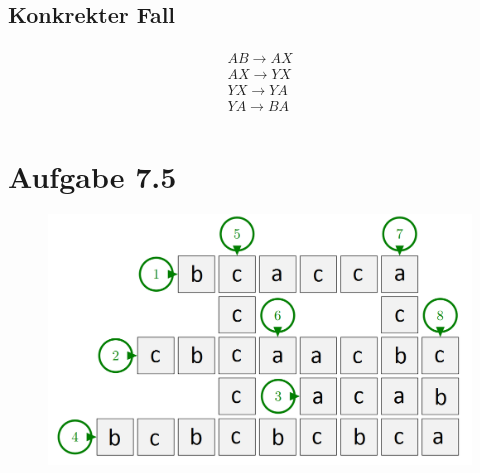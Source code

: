 \documentclass{article}
\begin{document}
\subsection*{Konkrekter Fall}
\begin{align*}
\begin{array}{l}
AB \rightarrow AX \\
AX \rightarrow YX \\
YX \rightarrow YA \\
YA \rightarrow BA
\end{array}
\end{align*}


\clearpage
\section*{Aufgabe 7.5}
\begin{figure}[!h]
  \includegraphics[scale=0.4]{crossword.png}
\end{figure}
\end{document}
